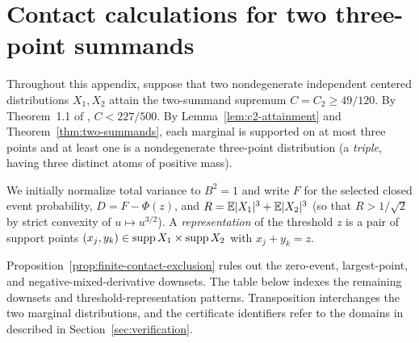 \section{Contact calculations for two three-point summands}\label{app:contacts}
Throughout this appendix, suppose that two nondegenerate independent centered
distributions $X_1,X_2$ attain the two-summand supremum $C=C_2\ge49/120$.
By Theorem~1.1 of \citet{BellIndependent2026}, $C<227/500$. By
Lemma~\ref{lem:c2-attainment} and Theorem~\ref{thm:two-summands}, each
marginal is supported on at most three points and at least one is a
nondegenerate three-point distribution (a \emph{triple}, having three
distinct atoms of positive mass).

We initially normalize total variance to $B^2=1$ and write $F$ for the
selected closed event probability, $D=F-\Phi(z)$, and $R=\mathbb E|X_1|^3+\mathbb E|X_2|^3$
(so that $R>1/\sqrt2$ by strict convexity of $u\mapsto u^{3/2}$). A
\emph{representation} of the threshold $z$ is a pair of support points
$(x_j,y_k)\in\operatorname{supp} X_1\times\operatorname{supp} X_2$ with $x_j+y_k=z$.

Proposition~\ref{prop:finite-contact-exclusion} rules out the zero-event,
largest-point, and negative-mixed-derivative downsets. The table below
indexes the remaining downsets and threshold-representation patterns.
Transposition interchanges the two marginal distributions, and the
certificate identifiers refer to the domains in
 described in
Section~\ref{sec:verification}.

